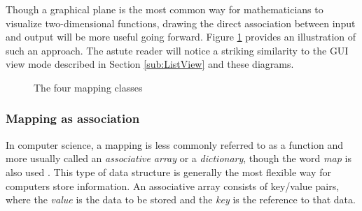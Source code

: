 Though a graphical plane is the most common way for mathematicians to visualize two-dimensional functions, drawing the direct association between input and output will be more useful going forward. Figure \ref{fig:types_of_mapping} provides an illustration of such an approach. The astute reader will notice a striking similarity to the GUI view mode described in Section \ref{sub:ListView} and these diagrams.  

\begin{figure}[ht]
\centering
\caption{The four mapping classes}
\label{fig:types_of_mapping}
\end{figure}

	\subsubsection{Mapping as association}

In computer science, a mapping is less commonly referred to as a function and more usually called an \emph{associative array} or a \emph{dictionary}, though the word \emph{map} is also used \cite{data_structures}. This type of data structure is generally the most flexible way for computers store information. An associative array consists of key/value pairs, where the \emph{value} is the data to be stored and the \emph{key} is the reference to that data. 

